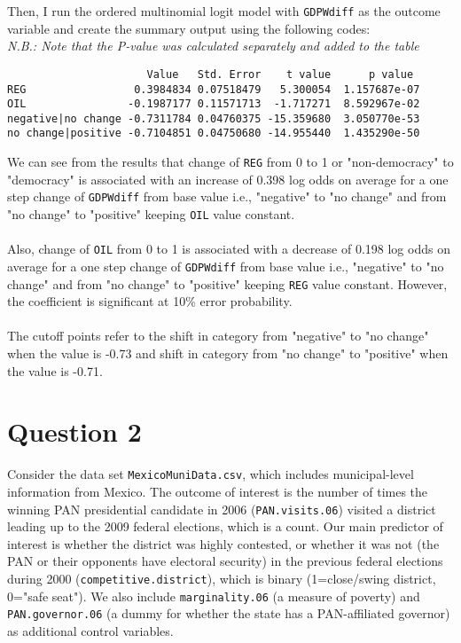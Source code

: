 \documentclass[12pt,letterpaper]{article}
\begin{document}
\begin{enumerate}
\noindent Then, I run the ordered multinomial logit model with \texttt{GDPWdiff} as the outcome variable and create the summary output using the following codes:\\
\textit{N.B.: Note that the P-value was calculated separately and added to the table}


\begin{Verbatim}
                      Value   Std. Error    t value      p value
REG                 0.3984834 0.07518479   5.300054  1.157687e-07
OIL                -0.1987177 0.11571713  -1.717271  8.592967e-02
negative|no change -0.7311784 0.04760375 -15.359680  3.050770e-53
no change|positive -0.7104851 0.04750680 -14.955440  1.435290e-50
\end{Verbatim}

We can see from the results that change of \texttt{REG} from 0 to 1 or "non-democracy" to "democracy" is associated with an increase of 0.398 log odds on average for a one step change of \texttt{GDPWdiff} from base value i.e., "negative" to "no change" and from "no change" to "positive" keeping \texttt{OIL} value constant.\\
\\Also, change of \texttt{OIL} from 0 to 1 is associated with a decrease of 0.198 log odds on average for a one step change of \texttt{GDPWdiff} from base value i.e., "negative" to "no change" and from "no change" to "positive" keeping \texttt{REG} value constant. However, the coefficient is significant at 10\% error probability.\\
\\The cutoff points refer to the shift in category from "negative" to "no change" when the value is -0.73 and shift in category from "no change" to "positive" when the value is -0.71.
	
\end{enumerate}

\section*{Question 2} 
\vspace{.25cm}

\noindent Consider the data set \texttt{MexicoMuniData.csv}, which includes municipal-level information from Mexico. The outcome of interest is the number of times the winning PAN presidential candidate in 2006 (\texttt{PAN.visits.06}) visited a district leading up to the 2009 federal elections, which is a count. Our main predictor of interest is whether the district was highly contested, or whether it was not (the PAN or their opponents have electoral security) in the previous federal elections during 2000 (\texttt{competitive.district}), which is binary (1=close/swing district, 0="safe seat"). We also include \texttt{marginality.06} (a measure of poverty) and \texttt{PAN.governor.06} (a dummy for whether the state has a PAN-affiliated governor) as additional control variables. 
\end{document}
